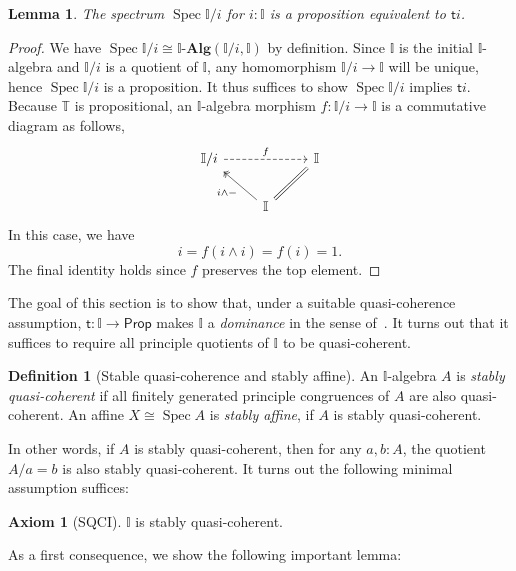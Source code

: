 \documentclass[12pt]{amsart}
\newtheorem{lemma}[theorem]{Lemma}
\theoremstyle{definition}
\newtheorem{definition}[theorem]{Definition}
\newtheorem*{axiom}{Axiom}
\newcommand{\mb}[1]{\mathbf{#1}}
\newcommand{\mbb}[1]{\mathbb{#1}}
\newcommand{\T}{\mbb T}
\newcommand{\I}{\mbb I}
\newcommand{\ms}[1]{\mathsf{#1}}
\newcommand{\alg}{\text{-}\mb{Alg}}
\newcommand{\pp}{\ms{Prop}}
\newcommand{\spec}{\operatorname{Spec}}
\begin{document}
\begin{lemma}\label{lem:openpropaffine}
  The spectrum $\spec\I/i$ for $i:\I$ is a proposition equivalent to $\ms ti$.
\end{lemma}
\begin{proof}
  We have $\spec \I/i \cong \I\alg(\I/i,\I)$ by definition. Since $\I$ is the initial $\I$-algebra and $\I/i$ is a quotient of $\I$, any homomorphism $\I/i \to \I$ will be unique, hence $\spec\I/i$ is a proposition. It thus suffices to show $\spec\I/i$ implies $\ms ti$. Because $\T$ is propositional, an $\I$-algebra morphism $f \colon \I/i \to \I$ is a commutative diagram as follows,
  \[
  \begin{tikzcd}
    \I/i \ar[rr, dashed, "f"] & & \I \\ 
    & \I \ar[ul, two heads, "i \wedge -"] \ar[ur, equal]
  \end{tikzcd}
  \]
  In this case, we have
  \[ i = f(i \wedge i) = f(i) = 1. \]
  The final identity holds since $f$ preserves the top element. 
\end{proof}

The goal of this section is to show that, under a suitable quasi-coherence assumption, $\ms t : \I \to \pp$ makes $\I$ a \emph{dominance} in the sense of~\cite{rosolini1986continuity}. It turns out that it suffices to require all principle quotients of $\I$ to be quasi-coherent.


\begin{definition}[Stable quasi-coherence and stably affine]
  An $\I$-algebra $A$ is \emph{stably quasi-coherent} if all finitely generated principle congruences of $A$ are also quasi-coherent. An affine $X \cong \spec A$ is \emph{stably affine}, if $A$ is stably quasi-coherent.
\end{definition}

In other words, if $A$ is stably quasi-coherent, then for any $a,b:A$, the quotient $A/a=b$ is also stably quasi-coherent. It turns out the following minimal assumption suffices:

\begin{axiom}[SQCI]\label{ax:sqci}
  $\I$ is stably quasi-coherent.
\end{axiom}

As a first consequence, we show the following important lemma:
\end{document}
